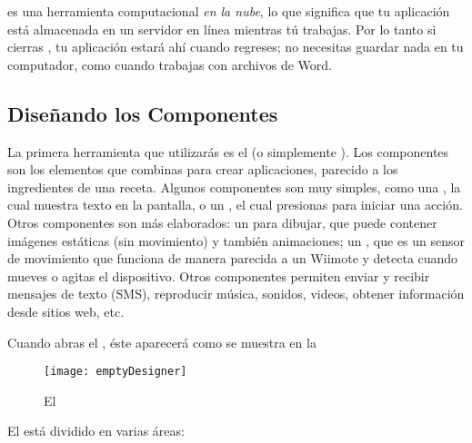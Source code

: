\AppInventor es una herramienta computacional \emph{en la nube}, lo
que significa que tu aplicación está almacenada en un servidor en
línea mientras tú trabajas. Por lo tanto si cierras \AppInventor, tu
aplicación estará ahí cuando regreses; no necesitas guardar nada en tu
computador, como cuando trabajas con archivos de Word.

\subsection*{Diseñando los Componentes}

La primera herramienta que utilizarás es el \componentDesigner (o
simplemente \designer). Los componentes son los elementos que combinas
para crear aplicaciones, parecido a los ingredientes de una
receta. Algunos componentes son muy simples, como una
, la cual muestra texto en la pantalla, o un
, el cual presionas para iniciar una acción. Otros
componentes son más elaborados: un  para dibujar,
que puede contener imágenes estáticas (sin movimiento) y también
animaciones; un , que es un sensor de
movimiento que funciona de manera parecida a un Wiimote y detecta
cuando mueves o agitas el dispositivo. Otros componentes permiten
enviar y recibir mensajes de texto (SMS), reproducir música, sonidos,
videos, obtener información desde sitios web, etc.

Cuando abras el \designer, éste aparecerá como se muestra en
la~

\begin{figure}[H]
\centering
\texttt{[image: emptyDesigner]}
\caption{El \componentDesigner}
\label{fig:emptyDesigner}
\end{figure}

El \designer está dividido en varias áreas:

